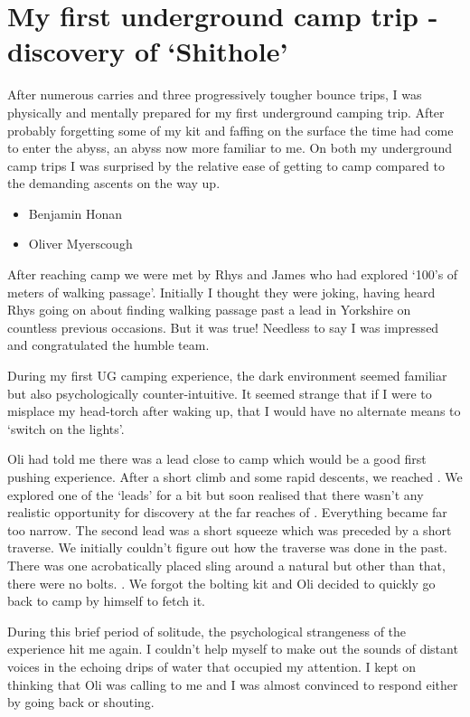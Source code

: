 \section{My first underground camp trip - discovery of `Shithole'}
After numerous carries and three progressively tougher bounce trips, I was physically and
mentally prepared for my first underground camping trip. After probably forgetting some of my kit and faffing on the surface the time had come to enter the abyss, an abyss now more familiar to me. On both my underground camp trips I was surprised by the relative ease of getting to camp compared to the demanding ascents on the way up. 

{\begin{itemize}
	\item Benjamin Honan
	\item Oliver Myerscough
\end{itemize}}

After reaching camp we were met by Rhys and James who had explored `100's of meters of walking passage'. Initially I thought they were joking, having heard Rhys going on about finding walking passage past a lead in Yorkshire on countless previous occasions. But it was true! Needless to say I was impressed and congratulated the humble team.

During my first UG camping experience, the dark environment seemed familiar but also psychologically counter-intuitive. It seemed strange that if I were to misplace my head-torch after waking up, that I would have no alternate means to `switch on the lights'. 

Oli had told me there was a lead close to camp which would be a good first pushing experience. After a short climb and some rapid descents, we reached . We explored one of the `leads' for a bit but soon realised that there wasn't any realistic opportunity for discovery at the far reaches of . Everything became far too narrow. The second lead was a short squeeze which was preceded by a short traverse. We initially couldn't figure out how the traverse was done in the past. There was one acrobatically placed sling around a natural but other than that, there were no bolts. . We forgot the bolting kit and Oli decided to quickly go back to camp by himself to fetch it. 

During this brief period of solitude, the psychological strangeness of the experience hit me again. I couldn't help myself to make out the sounds of distant voices in the echoing drips of water that occupied my attention. I kept on thinking that Oli was calling to me and I was almost convinced to respond either by going back or shouting.

